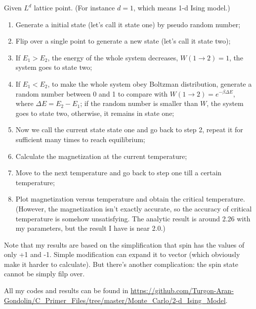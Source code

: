 \documentclass{article}
\begin{document}
Given $L^d$ lattice point. (For instance $d=1$, which means 1-d Ising model.)
\begin{enumerate}[(1)]
	\item Generate a initial state (let's call it state one) by pseudo random number;
	\item Flip over a single point to generate a new state (let's call it state two);
	\item If $E_1>E_2$, the energy of the whole system decreases, $W(1\rightarrow2)=1$, the system goes to state two;
	\item If $E_1<E_2$, to make the whole system obey Boltzman distribution, generate a random number between 0 and 1 to compare with $W(1\rightarrow2)=e^{-\beta\Delta E}$, where $\Delta E=E_2-E_1$; if the random number is smaller than $W$, the system goes to state two, otherwise, it remains in state one;
	\item Now we call the current state state one and go back to step 2, repeat it for sufficient many times to reach equilibrium;
	\item Calculate the magnetization at the current temperature;
	\item Move to the next temperature and go back to step one till a certain temperature;
	\item Plot magnetization versus temperature and obtain the critical temperature. (However, the magnetization isn't exactly accurate, so the accuracy of critical temperature is somehow unsatisfying. The analytic result is around 2.26 with my parameters, but the result I have is near 2.0.)
\end{enumerate}

Note that my results are based on the simplification that spin has the values of only +1 and -1. Simple modification can expand it to vector (which obviously make it harder to calculate). But there's another complication: the spin state cannot be simply filp over.

All my codes and results can be found in \url{https://github.com/Turgon-Aran-Gondolin/C_Primer_Files/tree/master/Monte_Carlo/2-d_Ising_Model}.

\end{document}
